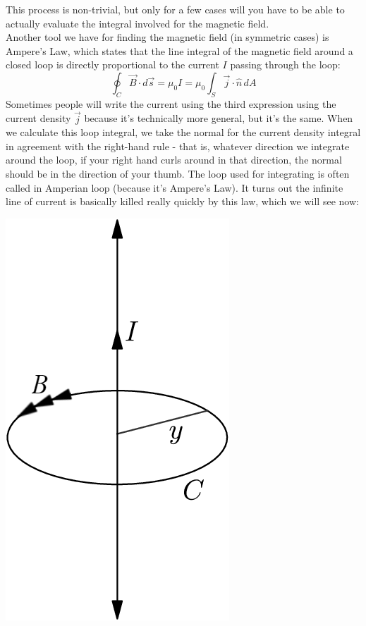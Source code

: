 This process is non-trivial, but only for a few cases will you have to be able to actually evaluate the integral involved for the magnetic field. \\
Another tool we have for finding the magnetic field (in symmetric cases) is Ampere's Law, which states that the line integral of the magnetic field around a closed loop is directly proportional to the current $I$ passing through the loop:
\[
	\oint_C \vec B \cdot d\vec s = \mu_0 I = \mu_0 \int_S \vec j \cdot \hat n \, dA
\]
Sometimes people will write the current using the third expression using the current density $\vec j$ because it's technically more general, but it's the same. When we calculate this loop integral, we take the normal for the current density integral in agreement with the right-hand rule - that is, whatever direction we integrate around the loop, if your right hand curls around in that direction, the normal should be in the direction of your thumb. The loop used for integrating is often called in Amperian loop (because it's Ampere's Law). It turns out the infinite line of current is basically killed really quickly by this law, which we will see now:\\
\begin{center}
	\includegraphics[scale=0.25]{images/em/ampere.png}
\end{center}
